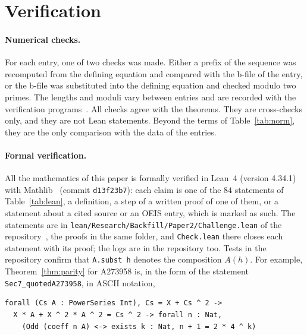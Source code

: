 \documentclass[11pt]{article}
\theoremstyle{remark}
\begin{document}
\section{Verification}\label{sec:lean}
\paragraph{Numerical checks.} For each entry, one of two checks was made.
Either a prefix of the sequence was recomputed from the defining equation and
compared with the b-file of the entry, or the b-file was substituted into the
defining equation and checked modulo two primes. The lengths and moduli vary
between entries and are recorded with the verification programs~\cite{repo}.
All checks agree with the theorems. They are cross-checks only, and they are not
Lean statements. Beyond the terms of Table~\ref{tab:norm}, they are the only
comparison with the data of the entries.

\paragraph{Formal verification.} All the mathematics of this paper is formally
verified in Lean~4 (version 4.34.1) with Mathlib~\cite{mathlib} (commit
\texttt{d13f23b7}): each claim is one of the $84$ statements of
Table~\ref{tab:lean}, a definition, a step of a written proof of one of them, or
a statement about a cited source or an OEIS entry, which is marked as such. The
statements are in \nolinkurl{lean/Research/Backfill/Paper2/Challenge.lean} of the
repository~\cite{repo}, the proofs in the same folder, and \texttt{Check.lean} there
closes each statement with its proof; the logs are in the repository too. Tests in the repository confirm that \texttt{A.subst h} denotes the
composition $A(h)$. For example, Theorem~\ref{thm:parity} for A273958 is, in the
form of the statement \texttt{Sec7\_quotedA273958}, in ASCII notation,
\begin{verbatim}
forall (Cs A : PowerSeries Int), Cs = X + Cs ^ 2 ->
  X * A + X ^ 2 * A ^ 2 = Cs ^ 2 -> forall n : Nat,
    (Odd (coeff n A) <-> exists k : Nat, n + 1 = 2 * 4 ^ k)
\end{verbatim}
\end{document}
